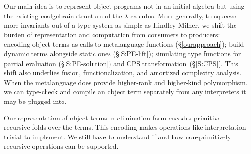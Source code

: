 Our main idea is to represent object programs not in an initial algebra
but using the existing coalgebraic structure of the $\lambda$-calculus.
More generally, to squeeze more invariants out of a type system as
simple as Hindley-Milner, we shift the burden of representation and
computation from consumers to producers: encoding object terms as calls
to metalanguage functions (\S\ref{ourapproach}); build dynamic terms
alongside static ones (\S\ref{S:PE-lift}); simulating type functions for
partial evaluation (\S\ref{S:PE-solution}) and CPS
transformation\ifshort\else~(\S\ref{S:CPS})\fi.
This shift also underlies fusion,
functionalization, and amortized complexity analysis.
\ifshort\else
When the metalanguage does provide higher-rank and higher-kind
polymorphism, we can type-check and compile an object term separately
from any interpreters it may be plugged into.
\fi

Our representation of object terms in elimination form encodes
primitive recursive folds over the terms. 
\ifshort\else
This encoding makes operations like interpretation trivial to implement.
\fi
We still
have to understand if and how non-primitively 
recursive operations can be supported.

